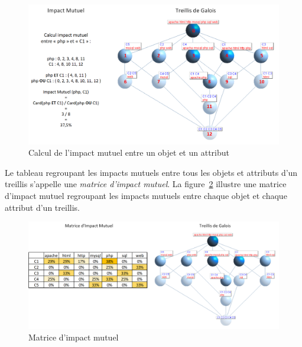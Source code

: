 \begin{figure}[htb!]
\centering
\centerline{  %
\includegraphics[scale=1]{2-Etat-de-l'Art/images/ACF/Metriques/exemple_impact-mutuel_calcul.png}
}
\caption{Calcul de l'impact mutuel entre un objet et un attribut}
\label{figure:2-S2-Metriques-ImpactMutuel-Exemple}
\end{figure}

Le tableau regroupant les impacts mutuels entre tous les objets et attributs d'un treillis s'appelle une \textit{matrice d'impact mutuel}.
La figure~\ref{figure:2-S2-Metriques-ImpactMutuel-Matrice} illustre une matrice d'impact mutuel regroupant les impacts mutuels entre chaque objet et chaque attribut d'un treillis.

\begin{figure}[htb!]
\centering
\centerline{  %
\includegraphics[scale=0.8]{2-Etat-de-l'Art/images/ACF/Metriques/exemple_impact-mutuel_matrice.png}
}
\caption{Matrice d'impact mutuel}
\label{figure:2-S2-Metriques-ImpactMutuel-Matrice}
\end{figure}

